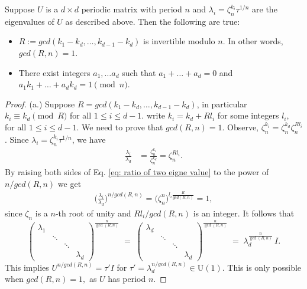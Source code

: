 \documentclass[10pt,a4paper]{amsart}
\begin{document}
\begin{lemma} \label{lemma:lemma 1}
    Suppose $U$ is a $d\times d$ periodic matrix with period $n$ and $\lambda_{i} = \zeta_{n}^{k_i} \tau^{1/n}$ are the eigenvalues of $U$ as described above. Then the following are true: 
    \begin{itemize}
        \item[(a)] $R := gcd(k_1 - k_d, \ldots, k_{d-1} - k_d)$ is invertible modulo $n$. In other words, $gcd(R,n) = 1$.
        \item[(b)] There exist integers $a_1, \ldots a_d$ such that $a_1 + \ldots + a_d = 0$ and $a_1 k_1 + \ldots + a_d k_d = 1 \pmod{n}$. 
    \end{itemize}
\end{lemma}

\begin{proof}\label{proof:lemma 1}
     (a.) Suppose $R = gcd(k_1 - k_d, \ldots, k_{d-1} - k_d)$, in particular $k_i \equiv k_d \pmod{R}$ for all $1 \leq i \leq d-1.$  write $k_i = k_{d} + Rl_{i}$ for some integers $l_i,$ for all $1 \leq i \leq d-1.$ We need to prove that $gcd(R,n) =1.$
     Observe,
     $\zeta_{n}^{k_i} = \zeta_{n}^{k_d} \zeta_{n}^{Rl_i} $. Since $\lambda_{i} = \zeta_{n}^{k_i} \tau^{1/n}$, we have 
     \begin{align}\label{eq: ratio of two eigne value}
         \frac{\lambda_i}{\lambda_d} &= \frac{\zeta_{n}^{k_i}}{ \zeta_{n}^{k_d}} = \zeta_{n}^{Rl_i}.
     \end{align}
     By raising both sides of Eq. \ref{eq: ratio of two eigne value} to the power of $n/gcd(R,n)$ we get
     \begin{align}
          \bigg(\frac{\lambda_i}{\lambda_d}\bigg)^{n/gcd(R,n)} = \bigg(\zeta_{n}^n\bigg)^{l_i\frac{R}{gcd(R,n)}} = 1,
     \end{align}
    since $\zeta_{n}$ is a $n$-th root of unity and  $Rl_i/gcd(R,n)$ is an integer. It follows that
\begin{equation}\label{eq:diag-power}
\begin{pmatrix}
\lambda_{1} &        &        &        \\
            & \ddots &        &        \\
            &        & \ddots &        \\
            &        &        & \lambda_{d}
\end{pmatrix}^{\tfrac{n}{\gcd(R,n)}}
\;=\;
\begin{pmatrix}
\lambda_{d} &        &        &        \\
            & \ddots &        &        \\
            &        & \ddots &        \\
            &        &        & \lambda_{d}
\end{pmatrix}^{\tfrac{n}{\gcd(R,n)}}
\;=\;
\lambda_{d}^{\tfrac{n}{\gcd(R,n)}}\,I.
\end{equation}
This implies $U^{n/gcd(R,n)} = \tau' I $ for $\tau' = \lambda_d^{n/gcd(R,n)} \in \mathrm{U}(1)$. This is only possible when $gcd(R,n) = 1,$ as $U$ has period $n$.


\end{proof}
\end{document}
